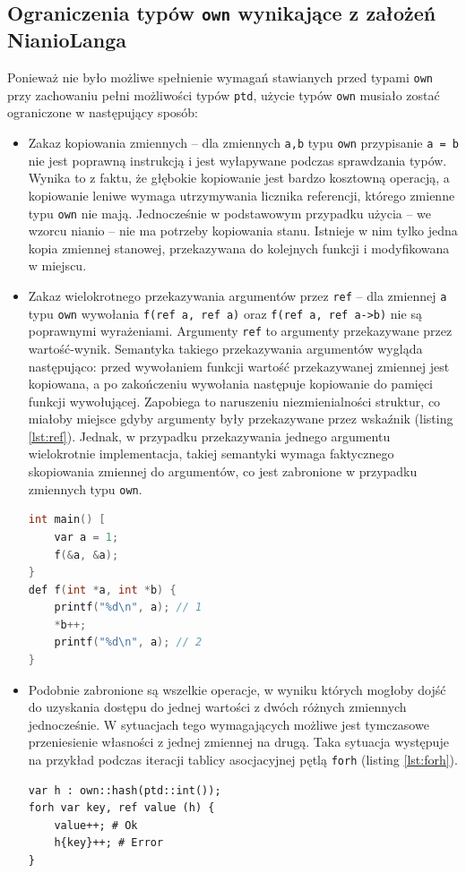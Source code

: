 \documentclass[licencjacka]{pracamgr}
\begin{document}
\subsection{Ograniczenia typów \texttt{own} wynikające z założeń NianioLanga}
Ponieważ nie było możliwe spełnienie wymagań stawianych przed typami \texttt{own} przy zachowaniu pełni
możliwości typów \texttt{ptd}, użycie typów \texttt{own} musiało zostać ograniczone w następujący sposób:
\begin{itemize}
 \item Zakaz kopiowania zmiennych -- dla zmiennych \texttt{a,b} typu \texttt{own} przypisanie
 \texttt{a = b} nie jest poprawną instrukcją i jest wyłapywane podczas sprawdzania typów.
 Wynika to z faktu, że głębokie kopiowanie jest bardzo kosztowną operacją, a kopiowanie leniwe wymaga
 utrzymywania licznika referencji, którego zmienne typu \texttt{own} nie mają.
 Jednocześnie w podstawowym przypadku użycia -- we wzorcu nianio -- nie ma potrzeby kopiowania stanu.
 Istnieje w nim tylko jedna kopia zmiennej stanowej, przekazywana do kolejnych funkcji i modyfikowana w miejscu.
 \item Zakaz wielokrotnego przekazywania argumentów przez \texttt{ref} -- dla zmiennej \texttt{a} typu
 \texttt{own} wywołania \texttt{f(ref a, ref a)} oraz \texttt{f(ref a, ref a->b)} nie są poprawnymi wyrażeniami.
 Argumenty \texttt{ref} to argumenty przekazywane przez wartość-wynik.
 Semantyka takiego przekazywania argumentów wygląda następująco: przed wywołaniem funkcji wartość przekazywanej
 zmiennej jest kopiowana, a po zakończeniu wywołania następuje kopiowanie do pamięci funkcji wywołującej.
 Zapobiega to naruszeniu niezmienialności struktur,
 co miałoby miejsce gdyby argumenty były przekazywane przez wskaźnik (listing \ref{lst:ref}).
 Jednak, w przypadku przekazywania jednego argumentu wielokrotnie implementacja, takiej semantyki wymaga
 faktycznego skopiowania zmiennej do argumentów, co jest zabronione w przypadku zmiennych typu \texttt{own}.
\begin{lstlisting}[caption={Naruszenie niezmienialności wartości w C},label={lst:ref},language=C]
int main() [
	var a = 1;
	f(&a, &a);
}
def f(int *a, int *b) {
	printf("%d\n", a); // 1
	*b++;
	printf("%d\n", a); // 2
}
\end{lstlisting}
 \item Podobnie zabronione są wszelkie operacje, w wyniku których mogłoby dojść do uzyskania dostępu
 do jednej wartości z dwóch różnych zmiennych jednocześnie. W sytuacjach tego wymagających możliwe jest tymczasowe
 przeniesienie własności z jednej zmiennej na drugą. Taka sytuacja występuje na przykład podczas iteracji
 tablicy asocjacyjnej pętlą \texttt{forh} (listing \ref{lst:forh}).
\begin{lstlisting}[caption={Odwołanie do zmiennej, która utraciła własność},label={lst:forh},language=nl]
var h : own::hash(ptd::int());
forh var key, ref value (h) {
	value++; # Ok
	h{key}++; # Error
}
\end{lstlisting}
\end{itemize}
\end{document}
